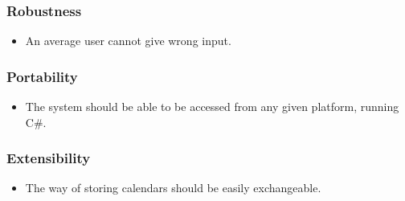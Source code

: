 \documentclass[10pt]{report}
\numberwithin{equation}{section} %
\numberwithin{figure}{section} %
\numberwithin{table}{section} %
\begin{document}
\subsubsection{Robustness}
\begin{itemize}
\item An average user cannot give wrong input.
\end{itemize}
\subsubsection{Portability}
\begin{itemize}
\item The system should be able to be accessed from any given platform, running C\#.
\end{itemize}
\subsubsection{Extensibility}
\begin{itemize}
\item The way of storing calendars should be easily exchangeable.
\end{itemize}
%
%
\end{document}
